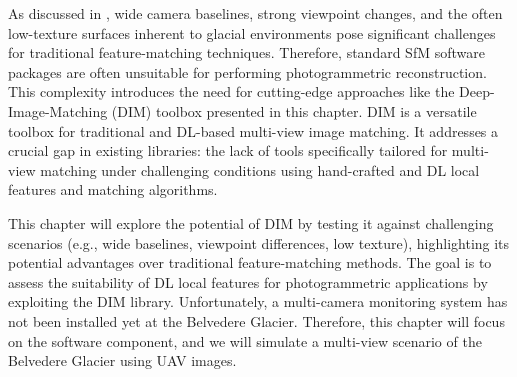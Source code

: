 As discussed in , wide camera baselines, strong viewpoint changes, and the often low-texture surfaces inherent to glacial environments pose significant challenges for traditional feature-matching techniques.
Therefore, standard SfM software packages are often unsuitable for performing photogrammetric reconstruction.
This complexity introduces the need for cutting-edge approaches like the Deep-Image-Matching (DIM) toolbox presented in this chapter.
DIM is a versatile toolbox for traditional and DL-based multi-view image matching. 
It addresses a crucial gap in existing libraries: the lack of tools specifically tailored for multi-view matching under challenging conditions using hand-crafted and DL local features and matching algorithms.

This chapter will explore the potential of DIM by testing it against challenging scenarios (e.g., wide baselines, viewpoint differences, low texture), highlighting its potential advantages over traditional feature-matching methods.  
The goal is to assess the suitability of DL local features for photogrammetric applications by exploiting the DIM library.
Unfortunately, a multi-camera monitoring system has not been installed yet at the Belvedere Glacier. 
Therefore, this chapter will focus on the software component, and we will simulate a multi-view scenario of the Belvedere Glacier using UAV images. 


